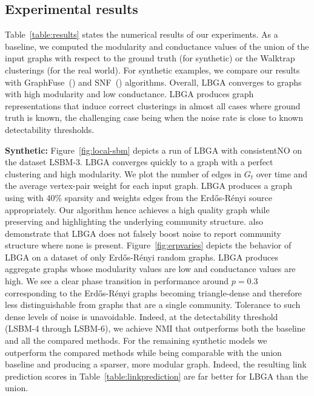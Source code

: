 \documentclass{article}
\newcommand{\er}{Erd\H{o}s-R\'{e}nyi }
\begin{document}
\subsection{Experimental results}
\label{sec:results}

Table~\ref{table:results} states the numerical results of our experiments. As a
baseline, we computed the modularity and conductance values of the union of the
input graphs with respect to the ground truth (for synthetic) or the Walktrap
clusterings (for the real world). For synthetic examples, we compare our
results with GraphFuse~(\cite{Papalexakis2013}) and SNF~(\cite{Wang14}) algorithms.
Overall, LBGA converges to graphs with high modularity and low conductance.
LBGA produces graph representations that induce correct clusterings in almost
all cases where ground truth is known, the challenging case being when the
noise rate is close to known detectability thresholds. 

\textbf{Synthetic: }
Figure~\ref{fig:local-sbm} depicts a run of LBGA with consistentNO on the
dataset LSBM-3. LBGA converges quickly to a graph with a perfect clustering and
high modularity. We plot the number of edges in $G_t$ over time and the average
vertex-pair weight for each input graph. LBGA produces a graph using with 40\%
sparsity and weights edges from the \er source appropriately. Our algorithm
hence achieves a high quality graph while preserving and highlighting the
underlying community structure.  also
demonstrate that LBGA does not falsely boost noise to report community
structure where none is present.  Figure~\ref{fig:erpvaries} depicts the
behavior of LBGA on a dataset of only \er random graphs. LBGA produces
aggregate graphs whose modularity values are low and conductance values are
high. We see a clear phase transition in performance around $p = 0.3$
corresponding to the \er graphs becoming triangle-dense and therefore less
distinguishable from graphs that are a single community. Tolerance to such
dense levels of noise is unavoidable. Indeed, at the detectability threshold
(LSBM-4 through LSBM-6), we achieve NMI that outperforms both the baseline and
all the compared methods. For the remaining synthetic models we outperform the
compared methods while being comparable with the union baseline and producing a
sparser, more modular graph. Indeed, the resulting link prediction scores in
Table~\ref{table:linkprediction} are far better for LBGA than the union. 
\end{document}
